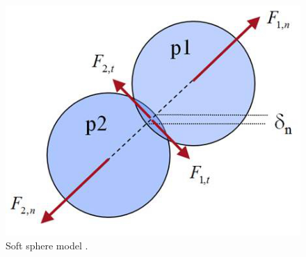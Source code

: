 \begin{figure}[!htb]
\centering
\includegraphics[width=.50\columnwidth]{images/062collision}
\caption[Soft sphere model]{Soft sphere model \citet{RefWorks:117}.}
\label{fig:062collision}
\end{figure}